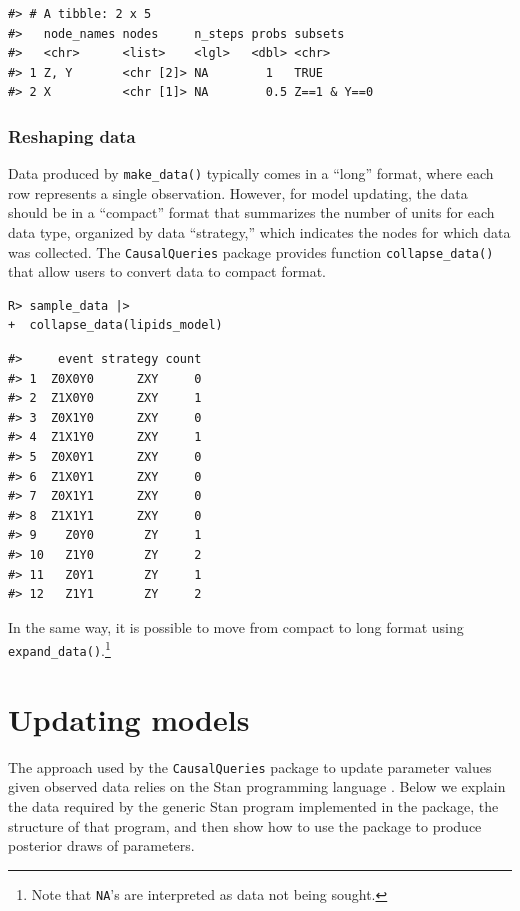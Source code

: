 \documentclass[
  11pt,
  article]{jss}
\begin{document}
\begin{verbatim}
#> # A tibble: 2 x 5
#>   node_names nodes     n_steps probs subsets    
#>   <chr>      <list>    <lgl>   <dbl> <chr>      
#> 1 Z, Y       <chr [2]> NA        1   TRUE       
#> 2 X          <chr [1]> NA        0.5 Z==1 & Y==0
\end{verbatim}

\subsubsection{Reshaping data}\label{reshaping-data}

Data produced by \texttt{make\_data()} typically comes in a ``long''
format, where each row represents a single observation. However, for
model updating, the data should be in a ``compact'' format that
summarizes the number of units for each data type, organized by data
``strategy,'' which indicates the nodes for which data was collected.
The \texttt{CausalQueries} package provides function
\texttt{collapse\_data()} that allow users to convert data to compact
format.

\begin{verbatim}
R> sample_data |> 
+  collapse_data(lipids_model)
\end{verbatim}

\begin{verbatim}
#>     event strategy count
#> 1  Z0X0Y0      ZXY     0
#> 2  Z1X0Y0      ZXY     1
#> 3  Z0X1Y0      ZXY     0
#> 4  Z1X1Y0      ZXY     1
#> 5  Z0X0Y1      ZXY     0
#> 6  Z1X0Y1      ZXY     0
#> 7  Z0X1Y1      ZXY     0
#> 8  Z1X1Y1      ZXY     0
#> 9    Z0Y0       ZY     1
#> 10   Z1Y0       ZY     2
#> 11   Z0Y1       ZY     1
#> 12   Z1Y1       ZY     2
\end{verbatim}

In the same way, it is possible to move from compact to long format
using \texttt{expand\_data()}.\footnote{Note that \texttt{NA}'s are
  interpreted as data not being sought.}

\section{Updating models}\label{sec-update}

The approach used by the \texttt{CausalQueries} package to update
parameter values given observed data relies on the Stan programming
language \citep{carpenter_stan_2017}. Below we explain the data required
by the generic Stan program implemented in the package, the structure of
that program, and then show how to use the package to produce posterior
draws of parameters.
\end{document}
